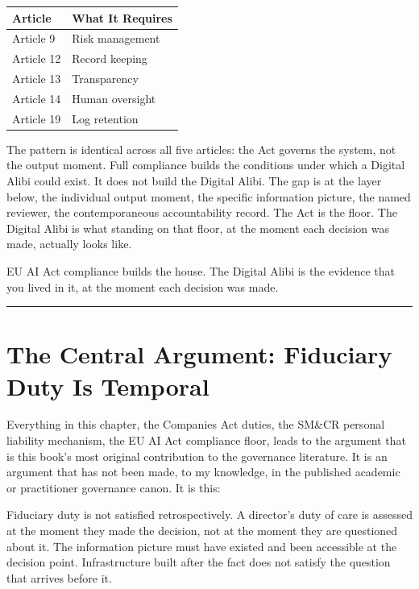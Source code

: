 \begin{longtable}[]{@{}ll@{}}
\toprule\noalign{}
Article & What It Requires \\
\midrule\noalign{}
\endhead
\bottomrule\noalign{}
\endlastfoot
Article 9 & Risk management \\
Article 12 & Record keeping \\
Article 13 & Transparency \\
Article 14 & Human oversight \\
Article 19 & Log retention \\
\end{longtable}

The pattern is identical across all five articles: the Act governs the system, not the output moment. Full compliance builds the conditions under which a Digital Alibi could exist. It does not build the Digital Alibi. The gap is at the layer below, the individual output moment, the specific information picture, the named reviewer, the contemporaneous accountability record. The Act is the floor. The Digital Alibi is what standing on that floor, at the moment each decision was made, actually looks like.

EU AI Act compliance builds the house. The Digital Alibi is the evidence that you lived in it, at the moment each decision was made.

\begin{center}\rule{0.5\linewidth}{0.5pt}\end{center}

\section{The Central Argument: Fiduciary Duty Is Temporal}

Everything in this chapter, the Companies Act duties, the SM\&CR personal liability mechanism, the EU AI Act compliance floor, leads to the argument that is this book's most original contribution to the governance literature. It is an argument that has not been made, to my knowledge, in the published academic or practitioner governance canon. It is this:

Fiduciary duty is not satisfied retrospectively. A director's duty of care is assessed at the moment they made the decision, not at the moment they are questioned about it. The information picture must have existed and been accessible at the decision point. Infrastructure built after the fact does not satisfy the question that arrives before it.

